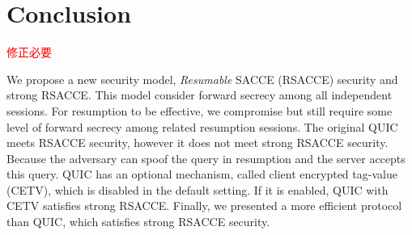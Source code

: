 \section{Conclusion} \label{sec:conclusion}

\textcolor{red} {
	修正必要
}

We propose a new security model, \textit{Resumable} SACCE (RSACCE) security and strong RSACCE.
This model consider forward secrecy among all independent sessions.
For resumption to be effective, we compromise but still require
some level of forward secrecy among related resumption sessions.
The original QUIC meets RSACCE security, however it does not meet strong RSACCE security.
Because the adversary can spoof the query in resumption and the server accepts this query.
QUIC has an optional mechanism, called client encrypted tag-value (CETV), which is disabled in the default setting.
If it is enabled, QUIC with CETV satisfies strong RSACCE.
Finally, we presented a more efficient protocol than QUIC, which satisfies strong RSACCE security.